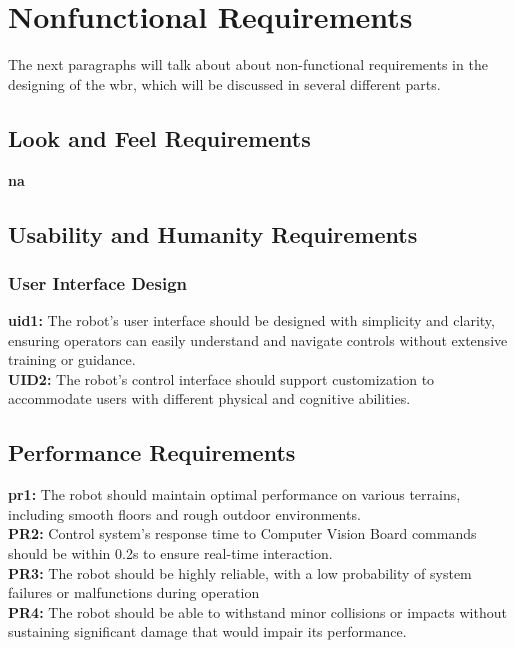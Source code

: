 \documentclass[12pt]{article}
\begin{document}
\section{Nonfunctional Requirements}
The next paragraphs will talk about about non-functional requirements in the designing of the \acrshort{wbr}, which will be discussed in several different parts.
\subsection{Look and Feel Requirements}
\textbf {\acrshort{na}}

\subsection{Usability and Humanity Requirements}
\subsubsection{User Interface Design}

\noindent\textbf{\acrshort{uid}1:} The robot's user interface should be designed with simplicity and clarity, ensuring operators can easily understand and navigate controls without extensive training or guidance.\\

\noindent\textbf{UID2:}  The robot's control interface should support customization to accommodate users with different physical and cognitive abilities.\\

\subsection{Performance Requirements}
\noindent\textbf{\acrshort{pr}1:}  The robot should maintain optimal performance on various terrains, including smooth floors and rough outdoor environments.\\

\noindent\textbf{PR2:}  Control system's response time to Computer Vision Board commands should be within 0.2s to ensure real-time interaction.\\

\noindent\textbf{PR3:}  The robot should be highly reliable, with a low probability of system failures or malfunctions during operation\\

\noindent\textbf{PR4:}  The robot should be able to withstand minor collisions or impacts without sustaining significant damage that would impair its performance.\\
\end{document}
